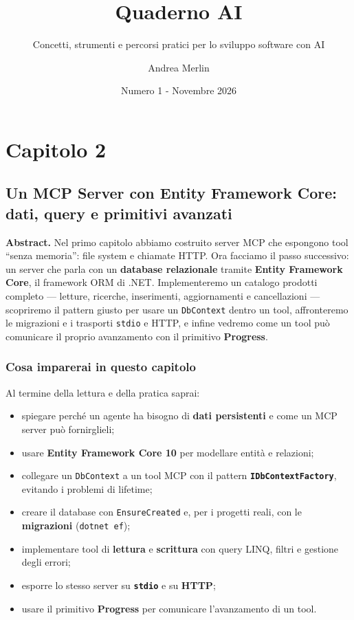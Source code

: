 \documentclass[
  italian,
  10pt,
]{book}
\title{Quaderno AI}
\subtitle{Concetti, strumenti e percorsi pratici per lo sviluppo
software con AI}
\author{Andrea Merlin}
\date{Numero 1 - Novembre 2026}
\providecommand{\tightlist}{%
  \setlength{\itemsep}{0pt}\setlength{\parskip}{0pt}}
\begin{document}
\frontmatter
\maketitle

{
\setcounter{tocdepth}{1}
\tableofcontents
}
\mainmatter
\chapter{Capitolo 2}\label{capitolo-2}

\section{Un MCP Server con Entity Framework Core: dati, query e
primitivi
avanzati}\label{un-mcp-server-con-entity-framework-core-dati-query-e-primitivi-avanzati}

\textbf{Abstract.} Nel primo capitolo abbiamo costruito server MCP che
espongono tool ``senza memoria'': file system e chiamate HTTP. Ora
facciamo il passo successivo: un server che parla con un
\textbf{database relazionale} tramite \textbf{Entity Framework Core}, il
framework ORM di .NET. Implementeremo un catalogo prodotti completo ---
letture, ricerche, inserimenti, aggiornamenti e cancellazioni ---
scopriremo il pattern giusto per usare un \texttt{DbContext} dentro un
tool, affronteremo le migrazioni e i trasporti \texttt{stdio} e HTTP, e
infine vedremo come un tool può comunicare il proprio avanzamento con il
primitivo \textbf{Progress}.

\subsection{Cosa imparerai in questo
capitolo}\label{cosa-imparerai-in-questo-capitolo}

Al termine della lettura e della pratica saprai:

\begin{itemize}
\tightlist
\item
  spiegare perché un agente ha bisogno di \textbf{dati persistenti} e
  come un MCP server può fornirglieli;
\item
  usare \textbf{Entity Framework Core 10} per modellare entità e
  relazioni;
\item
  collegare un \texttt{DbContext} a un tool MCP con il pattern
  \textbf{\texttt{IDbContextFactory}}, evitando i problemi di lifetime;
\item
  creare il database con \texttt{EnsureCreated} e, per i progetti reali,
  con le \textbf{migrazioni} (\texttt{dotnet\ ef});
\item
  implementare tool di \textbf{lettura} e \textbf{scrittura} con query
  LINQ, filtri e gestione degli errori;
\item
  esporre lo stesso server su \textbf{\texttt{stdio}} e su
  \textbf{HTTP};
\item
  usare il primitivo \textbf{Progress} per comunicare l'avanzamento di
  un tool.
\end{itemize}
\end{document}
